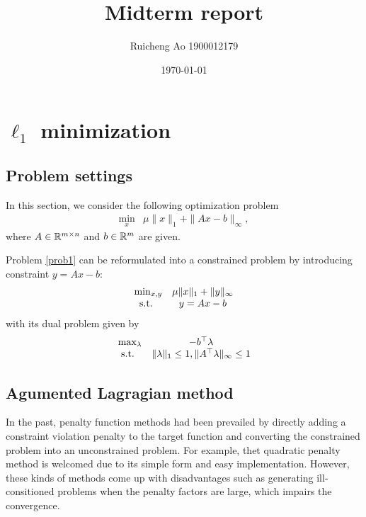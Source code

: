 \documentclass{article}
\title{Midterm report}
\date{\today}
\author{Ruicheng Ao 1900012179}
\begin{document}
\maketitle
\section{$\ell_1$ minimization}
\subsection{Problem settings}
In this section, we consider the following optimization problem
\begin{equation}\label{prob1}
\begin{array}{cc}
\min_x & \mu\|x\|_1+\|Ax-b\|_\infty,
\end{array}
\end{equation}
where $A\in\mathbb R^{m\times n}$ and $b\in\mathbb R^m$ are given.

Problem \eqref{prob1} can be reformulated into a constrained problem by introducing constraint $y=Ax-b$:
\begin{equation}\label{prob2}
\begin{array}{cc}
\min_{x,y} & \mu\|x\|_1+\|y\|_\infty \\
\text{s.t. } & y=Ax-b 
\end{array}
\end{equation}
with its dual problem given by 
\begin{equation}\label{prob3}
\begin{array}{cc}
	\max_{\lambda} &-b^\top\lambda \\
\text{s.t. } & \|\lambda\|_1\le1,\|A^\top\lambda\|_\infty\le1
\end{array}
\end{equation}
\subsection{Agumented Lagragian method}
In the past, penalty function methods had been prevailed by directly adding a constraint violation penalty to the target function \cite[section 10]{boyd2004convex} and converting the constrained problem into an unconstrained problem. For example, thet quadratic penalty method is welcomed due to its simple form and easy implementation. However, these kinds of methods come up with disadvantages such as generating ill-consitioned problems when the penalty factors are large, which impairs the convergence.
\end{document}
